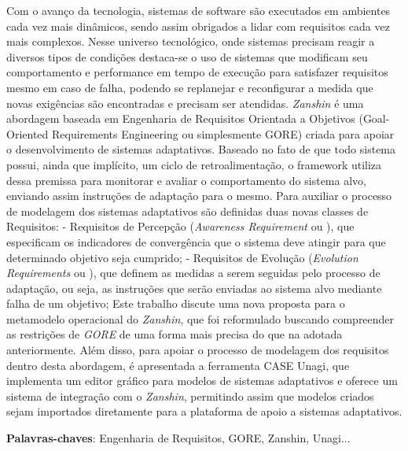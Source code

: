 \documentclass[
	12pt,				%
	openright,			%
	oneside,
	a4paper,			%
	english,			%
	french,				%
	spanish,			%
	brazil				%
	]{abntex2}
\newcommand{\gore}{\textit{GORE}\xspace}
\newcommand{\zanshin}{\textit{Zanshin}\xspace}
\begin{document}
\setlength{\absparsep}{18pt}
\begin{resumo}

Com o avanço da tecnologia, sistemas de software são executados em ambientes cada vez mais dinâmicos, sendo assim obrigados a lidar com requisitos cada vez mais complexos. Nesse universo tecnológico, onde sistemas precisam reagir a diversos tipos de condições destaca-se o uso de sistemas que modificam seu comportamento e performance em tempo de execução para satisfazer requisitos mesmo em caso de falha, podendo se replanejar e reconfigurar a medida que novas exigências são encontradas e precisam ser atendidas.
\zanshin é uma abordagem baseada em Engenharia de Requisitos Orientada a Objetivos (Goal-Oriented Requirements Engineering ou simplesmente GORE) criada para apoiar o desenvolvimento de sistemas adaptativos. Baseado no fato de que todo sistema possui, ainda que implícito, um ciclo de retroalimentação, o framework utiliza dessa premissa para monitorar e avaliar o comportamento do sistema alvo, enviando assim instruções de adaptação para o mesmo. Para auxiliar o processo de modelagem dos sistemas adaptativos são definidas duas novas classes de Requisitos:
- Requisitos de Percepção (\textit{Awareness Requirement} ou \awreq), que especificam os indicadores de convergência que o sistema deve atingir para que determinado objetivo seja cumprido;
- Requisitos de Evolução (\textit{Evolution Requirements} ou \evoreq), que definem as medidas a serem seguidas pelo processo de adaptação, ou seja, as instruções que serão enviadas ao sistema alvo mediante falha de um objetivo;
Este trabalho discute uma nova proposta para o metamodelo operacional do \zanshin, que foi reformulado buscando compreender as restrições de \gore de uma forma mais precisa do que na adotada anteriormente.
Além disso, para apoiar o processo de modelagem dos requisitos dentro desta abordagem, é apresentada a ferramenta CASE Unagi, que implementa um editor gráfico para modelos de sistemas adaptativos e oferece um sistema de integração com o \zanshin, permitindo assim que modelos criados sejam importados diretamente para a plataforma de apoio a sistemas adaptativos.



\textbf{Palavras-chaves}:  Engenharia de Requisitos, GORE, Zanshin, Unagi...
\end{resumo}
\end{document}
